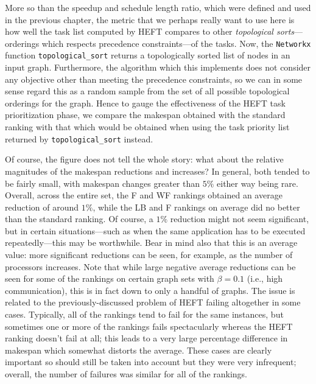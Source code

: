 \documentclass[12pt]{article}
\begin{document}
More so than the speedup and schedule length ratio, which were defined and used in the previous chapter, the metric that we perhaps really want to use here is how well the task list computed by HEFT compares to other {\em topological sorts}---orderings which respects precedence constraints---of the tasks. Now, the {\tt Networkx} function {\tt topological\_sort} returns a topologically sorted list of nodes in an input graph. Furthermore, the algorithm which this implements does not consider any objective other than meeting the precedence constraints, so we can in some sense regard this as a random sample from the set of all possible topological orderings for the graph. Hence to gauge the effectiveness of the HEFT task prioritization phase, we compare the makespan obtained with the standard ranking with that which would be obtained when using the task priority list returned by {\tt topological\_sort} instead. 

Of course, the figure does not tell the whole story: what about the relative magnitudes of the makespan reductions and increases? In general, both tended to be fairly small, with makespan changes greater than $5\%$ either way being rare. Overall, across the entire set, the F and WF rankings obtained an average reduction of around $1\%$, while the LB and F rankings on average did no better than the standard ranking. Of course, a $1\%$ reduction might not seem significant, but in certain situations---such as when the same application has to be executed repeatedly---this may be worthwhile. Bear in mind also that this is an average value: more significant reductions can be seen, for example, as the number of processors increases. Note that while large negative average reductions can be seen for some of the rankings on certain graph sets with $\beta = 0.1$ (i.e., high communication), this is in fact down to only a handful of graphs. The issue is related to the previously-discussed problem of HEFT failing altogether in some cases. Typically, all of the rankings tend to fail for the same instances, but sometimes one or more of the rankings fails spectacularly whereas the HEFT ranking doesn't fail at all; this leads to a very large percentage difference in makespan which somewhat distorts the average. These cases are clearly important so should still be taken into account but they were very infrequent; overall, the number of failures was similar for all of the rankings.   
\end{document}
